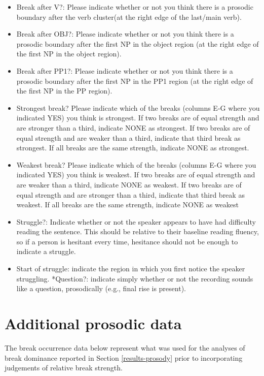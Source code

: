 \documentclass[11pt,oneside]{book}
\providecommand{\tightlist}{%
  \setlength{\itemsep}{0pt}\setlength{\parskip}{0pt}}
\begin{document}
\begin{itemize}
\tightlist
\item
  Break after V?: Please indicate whether or not you think there is a prosodic boundary after the verb cluster(at the right edge of the last/main verb).
\item
  Break after OBJ?: Please indicate whether or not you think there is a prosodic boundary after the first NP in the object region (at the right edge of the first NP in the object region).
\item
  Break after PP1?: Please indicate whether or not you think there is a prosodic boundary after the first NP in the PP1 region (at the right edge of the first NP in the PP region).
\item
  Strongest break? Please indicate which of the breaks (columns E-G where you indicated YES) you think is strongest. If two breaks are of equal strength and are stronger than a third, indicate NONE as strongest. If two breaks are of equal strength and are weaker than a third, indicate that third break as strongest. If all breaks are the same strength, indicate NONE as strongest.
\item
  Weakest break? Please indicate which of the breaks (columns E-G where you indicated YES) you think is weakest. If two breaks are of equal strength and are weaker than a third, indicate NONE as weakest. If two breaks are of equal strength and are stronger than a third, indicate that third break as weakest. If all breaks are the same strength, indicate NONE as weakest
\item
  Struggle?: Indicate whether or not the speaker appears to have had difficulty reading the sentence. This should be relative to their baseline reading fluency, so if a person is hesitant every time, hesitance should not be enough to indicate a struggle.
\item
  Start of struggle: indicate the region in which you first notice the speaker struggling.
  *Question?: indicate simply whether or not the recording sounds like a question, prosodically (e.g., final rise is present).
\end{itemize}

\clearpage

\hypertarget{proApp}{%
\chapter{Additional prosodic data}\label{proApp}}

The break occurrence data below represent what was used for the analyses of break dominance reported in Section \ref{results-prosody} prior to incorporating judgements of relative break strength.
\end{document}
